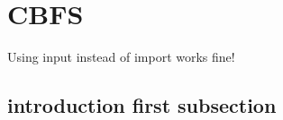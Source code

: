 \documentclass[crop=false]{standalone}
\begin{document}
\section{CBFS}
Using input instead of import works fine!

\subsection{introduction first subsection}
\end{document}

